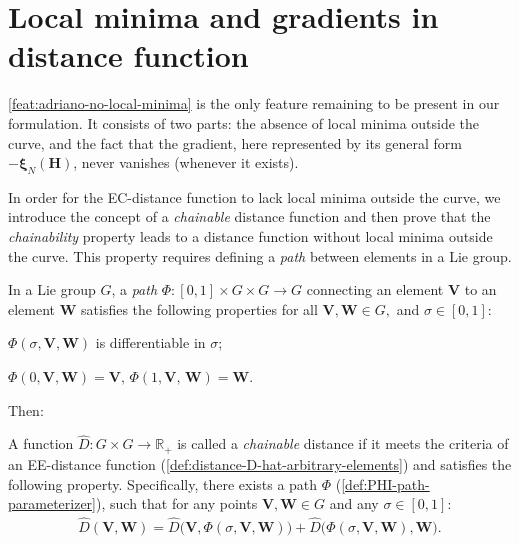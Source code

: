 \section{Local minima and gradients in distance function}
\cref{feat:adriano-no-local-minima} is the only feature remaining to be present in our formulation. It consists of two parts: the absence of local minima outside the curve, and the fact that the gradient, here represented by its general form $-\boldsymbol{\xi}_N(\mathbf{H})$, never vanishes (whenever it exists).

In order for the EC-distance function to lack local minima outside the curve, we introduce the concept of a \emph{chainable} distance function and then prove that the \emph{chainability} property leads to a distance function without local minima outside the curve. This property requires defining a \emph{path} between elements in a Lie group.
\begin{definition}[Path]\label{def:PHI-path-parameterizer}
    In a Lie group $G$, a \emph{path} $\Phi:[0, 1] \times G \times G \to G$ connecting an element $\mathbf{V}$ to an element $\mathbf{W}$ satisfies the following properties for all $\mathbf{V}, \mathbf{W}\in G,$ and $\sigma\in[0,1]$:
    \begin{property}
        \item $\Phi(\sigma, \mathbf{V}, \mathbf{W})$ is differentiable in $\sigma$;\label{prop:path-continuous}
        \item $\Phi(0, \mathbf{V}, \mathbf{W}) = \mathbf{V},\,\Phi(1, \mathbf{V},\, \mathbf{W}) = \mathbf{W}$.\label{prop:path-initUfinalV}
    \end{property}
\end{definition}

Then:
\begin{definition}\label{def:chainable-distance}
    A function $\widehat{D}: G \times G \to \mathbb{R}_+$ is called a \emph{chainable} distance if it meets the criteria of an EE-distance function (\cref{def:distance-D-hat-arbitrary-elements}) and satisfies the following property. Specifically, there exists a path $\Phi$ (\cref{def:PHI-path-parameterizer}), such that for any points $\mathbf{V}, \mathbf{W} \in G$ and any $\sigma \in [0,1]$:
    \begin{align*}
        \widehat{D}(\mathbf{V}, \mathbf{W}) = \widehat{D}\bigl(\mathbf{V}, \Phi(\sigma, \mathbf{V}, \mathbf{W})\bigr) + \widehat{D}\bigl(\Phi(\sigma, \mathbf{V}, \mathbf{W}), \mathbf{W} \bigr).
    \end{align*}
\end{definition}

